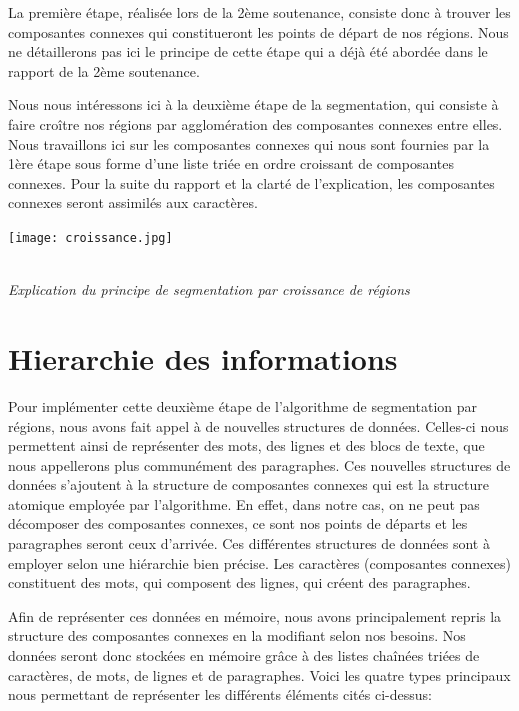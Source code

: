 \documentclass[a4paper,12pt]{report}
\begin{document}
La première étape, réalisée lors de la 2ème soutenance, consiste donc à trouver les
composantes connexes qui constitueront les points de départ de nos régions. Nous ne
détaillerons pas ici le principe de cette étape qui a déjà été abordée dans le rapport de la
2ème soutenance.

Nous nous intéressons ici à la deuxième étape de la segmentation, qui consiste à faire
croître nos régions par agglomération des composantes connexes entre elles. Nous
travaillons ici sur les composantes connexes qui nous sont fournies par la 1ère étape sous
forme d'une liste triée en ordre croissant de composantes connexes. Pour la suite du
rapport et la clarté de l'explication, les composantes connexes seront
assimilés aux caractères.

\begin{center}
  \texttt{[image: croissance.jpg]}
  \caption{\\\emph{Explication du principe de segmentation par croissance de r\'egions}}
\end{center}



\section{Hierarchie des informations}

Pour implémenter cette deuxième étape de l'algorithme de segmentation par régions,
nous avons fait appel à de nouvelles structures de données. Celles-ci nous permettent
ainsi de représenter des mots, des lignes et des blocs de texte, que nous appellerons plus
communément des paragraphes. Ces nouvelles structures de données s'ajoutent à la
structure de composantes connexes qui est la structure atomique employée par
l'algorithme. En effet, dans notre cas, on ne peut pas décomposer des composantes
connexes, ce sont nos points de départs et les paragraphes seront ceux d'arrivée. Ces
différentes structures de données sont à employer selon une hiérarchie bien précise. Les
caractères (composantes connexes) constituent des mots, qui composent des lignes, qui
créent des paragraphes.

Afin de représenter ces données en mémoire, nous avons principalement repris la
structure des composantes connexes en la modifiant selon nos besoins. Nos données seront
donc stockées en mémoire grâce à des listes chaînées triées de caractères, de mots, de
lignes et de paragraphes. Voici les quatre types principaux nous permettant de représenter
les différents éléments cités ci-dessus:
\end{document}
